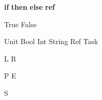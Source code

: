 


\newoperator{\If}
  {\textbf{if}}
\newoperator{\Then}
  {\textbf{then}}
\newoperator{\Else}
  {\textbf{else}}
\newoperator{\Ref}
  {\textbf{ref}}



\newoperator{\True}
  {\textsf{True}}
\newoperator{\False}
  {\textsf{False}}

\newcommand*{\astring}[1]
  {\textit{``#1''}}



\newoperator{\Unit}
  {\textsf{Unit}}
\newoperator{\Bool}
  {\textsf{Bool}}
\newoperator{\Int}
  {\textsf{Int}}
\newoperator{\String}
  {\textsf{String}}
\newoperator{\Reference}
  {\textsf{Ref}}
\newoperator{\Task}
  {\textsf{Task}}



\newoperator{\Seq}
  {\vartriangleright}
\newoperator{\Cont}
  {\blacktriangleright}
\let\And\relax
\newoperator{\And}
  {\otimes}
\newoperator{\Or}
  {\oplus}
\newoperator{\Edit}
  {\square}
\newoperator{\Empty}
  {\boxtimes}
\newoperator{\Watch}
  {\blacksquare}
\newoperator{\Fail}
  {\circlearrowleft}

\newoperator{\Both}
  {\odot}



\newoperator{\Left}
  {\textsf{L}}
\newoperator{\Right}
  {\textsf{R}}

\newcommand*{\Clear}
  {\textsf{C}}
\newcommand*{\Next}
  {\textsf{N}}
\newoperator{\Pick}
  {\textsf{P}}
\newoperator{\Execute}
  {\textsf{E}}


\newcommand*{\First}
  {\textsf{F}}
\newcommand*{\Second}
  {\textsf{S}}
\newoperator{\Other}
  {\textsf{S}}



\newcommand*{\downto}
  {\Downarrow}
\newcommand*{\normalise}
  {\;\rightarrow\!\shortmid\;}
\newcommand*{\handle}[1]
  {\;\xrightarrow{\;#1\;}\;}

\newcommand*{\Value}
  {\mathcal{V}}
